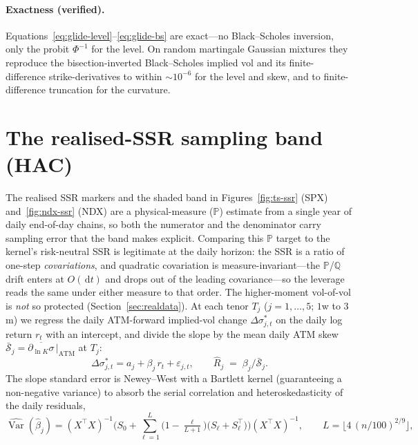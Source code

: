 \documentclass[11pt]{article}
\newcommand{\dd}{\,\mathrm{d}}
\begin{document}
\paragraph{Exactness (verified).} Equations~\eqref{eq:glide-level}--\eqref{eq:glide-bs} are
exact---no Black--Scholes inversion, only the probit $\Phi^{-1}$ for the level. On random
martingale Gaussian mixtures they reproduce the bisection-inverted Black--Scholes implied vol
and its finite-difference strike-derivatives to within $\sim\!10^{-6}$ for the level and skew,
and to finite-difference truncation for the curvature.

\section{The realised-SSR sampling band (HAC)}
\label{app:hac}
The realised SSR markers and the shaded band in Figures~\ref{fig:ts-ssr} (SPX) and~\ref{fig:ndx-ssr}
(NDX) are a physical-measure ($\mathbb P$) estimate from a single year of daily end-of-day chains, so
both the numerator and the denominator carry sampling error that the band makes explicit. Comparing this
$\mathbb P$ target to the kernel's risk-neutral SSR is legitimate at the daily horizon: the SSR is a ratio of
one-step \emph{covariations}, and quadratic covariation is measure-invariant---the $\mathbb P$/$\mathbb Q$
drift enters at $O(\dd t)$ and drops out of the leading covariance---so the leverage reads the same under
either measure to that order. The higher-moment vol-of-vol is \emph{not} so protected (Section~\ref{sec:realdata}). At each tenor
$T_j$ ($j=1,\dots,5$; $1$w to $3$m) we regress the daily ATM-forward implied-vol change
$\Delta\sigma^\ast_{j,t}$ on the daily log return $r_t$ with an intercept, and divide the slope by the mean
daily ATM skew $\bar{\mathcal S}_j=\overline{\partial_{\ln K}\sigma}\,|_{\mathrm{ATM}}$ at $T_j$:
\begin{equation}
  \Delta\sigma^\ast_{j,t} = a_j + \beta_j\, r_t + \varepsilon_{j,t},
  \qquad
  \widehat{R}_j \;=\; \beta_j\big/\bar{\mathcal S}_j .
\end{equation}
The slope standard error is Newey--West with a Bartlett kernel (guaranteeing a non-negative variance) to
absorb the serial correlation and heteroskedasticity of the daily residuals,
\begin{equation}
  \widehat{\operatorname{Var}}(\hat\beta_j)=(X^\top X)^{-1}\Big(S_0+\!\sum_{\ell=1}^{L}\!\Big(1-\tfrac{\ell}{L+1}\Big)\big(S_\ell+S_\ell^\top\big)\Big)(X^\top X)^{-1},
  \qquad L=\big\lfloor 4\,(n/100)^{2/9}\big\rfloor,
\end{equation}
\end{document}
